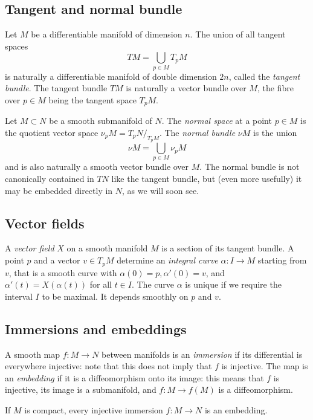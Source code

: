 \subsection{Tangent and normal bundle}
Let $M$ be a differentiable manifold of dimension $n$. The union of all tangent spaces 
$$TM = \bigcup_{p\in M} T_pM$$ 
is naturally a differentiable manifold of double dimension $2n$, called the \emph{tangent bundle}. The tangent bundle $TM$ is naturally a vector bundle over $M$, the fibre over $p\in M$ being the tangent space $T_pM$. 

Let $M\subset N$ be a smooth submanifold of $N$. The \emph{normal space} at a point $p\in M$ is the quotient vector space $\nu_pM = T_pN/_{T_pM}$. The \emph{normal bundle} $\nu M$ is the union
$$\nu M = \bigcup_{p\in M} \nu_p M$$ 
and is also naturally a smooth vector bundle over $M$. The normal bundle is not  canonically contained in $TN$ like the tangent bundle, but (even more usefully) it may be embedded directly in $N$, as we will soon see.

\subsection{Vector fields}
A \emph{vector field} $X$ on a smooth manifold $M$ is a section of its tangent bundle. A point $p$ and a vector $v\in T_pM$ determine an \emph{integral curve} $\alpha\colon I\to M$ starting from $v$, that is a smooth curve with $\alpha(0) = p, \alpha'(0) = v$, and $\alpha'(t) = X(\alpha(t))$ for all $t\in I$. The curve $\alpha$ is unique if we require the interval $I$ to be maximal. It depends smoothly on $p$ and $v$.

\subsection{Immersions and embeddings}
A smooth map $f\colon M \to N$ between manifolds is an \emph{immersion} if its differential is everywhere injective: note that this does not imply that $f$ is injective. 
The map is an \emph{embedding} if it is a diffeomorphism onto its image: this means that $f$ is injective, its image is a submanifold, and $f\colon M \to f(M)$ is a diffeomorphism. 

\begin{teo} If $M$ is compact, every injective immersion $f\colon M \to N$ is an embedding.
\end{teo}


